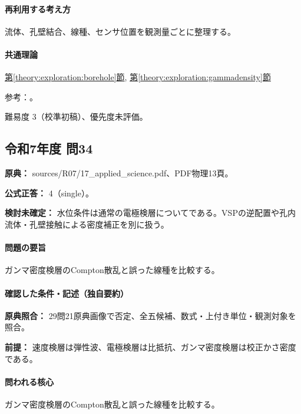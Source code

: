 \paragraph{再利用する考え方} 流体、孔壁結合、線種、センサ位置を観測量ごとに整理する。

\paragraph{共通理論} \hyperref[theory:exploration:borehole]{第\ref*{theory:exploration:borehole}節}, \hyperref[theory:exploration:gammadensity]{第\ref*{theory:exploration:gammadensity}節}

\par 参考：\cite{epa_borehole_resistivity,epa_gamma_density,geebec_ps,oyo_suspension}。

\par 難易度 3（校準初稿）、優先度未評価。

\subsection{令和7年度 問34}
\label{q:r07-reg-applied-34}

\noindent\textbf{原典：} sources/R07/17\_applied\_science.pdf、PDF物理13頁。

\textbf{公式正答：} 4（single）。

\par\textbf{検討未確定：} 水位条件は通常の電極検層についてである。VSPの逆配置や孔内流体・孔壁接触による密度補正を別に扱う。

\paragraph{問題の要旨} ガンマ密度検層のCompton散乱と誤った線種を比較する。

\paragraph{確認した条件・記述（独自要約）}\mbox{}\par

\noindent\textbf{原典照合：} 29問21原典画像で否定、全五候補、数式・上付き単位・観測対象を照合。\par

\noindent\textbf{前提：} 速度検層は弾性波、電極検層は比抵抗、ガンマ密度検層は校正かさ密度である。\par

\paragraph{問われる核心} ガンマ密度検層のCompton散乱と誤った線種を比較する。

